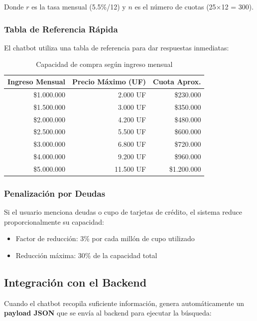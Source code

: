 \documentclass[11pt,letterpaper]{article}
\begin{document}
Donde $r$ es la tasa mensual (5.5\%/12) y $n$ es el número de cuotas (25$\times$12 = 300).

\subsubsection{Tabla de Referencia Rápida}

El chatbot utiliza una tabla de referencia para dar respuestas inmediatas:

\begin{table}[H]
\centering
\caption{Capacidad de compra según ingreso mensual}
\label{tab:capacidad}
\begin{tabular}{@{}rrr@{}}
\toprule
\textbf{Ingreso Mensual} & \textbf{Precio Máximo (UF)} & \textbf{Cuota Aprox.} \\
\midrule
\$1.000.000 & 2.000 UF & \$230.000 \\
\$1.500.000 & 3.000 UF & \$350.000 \\
\$2.000.000 & 4.200 UF & \$480.000 \\
\$2.500.000 & 5.500 UF & \$600.000 \\
\$3.000.000 & 6.800 UF & \$720.000 \\
\$4.000.000 & 9.200 UF & \$960.000 \\
\$5.000.000 & 11.500 UF & \$1.200.000 \\
\bottomrule
\end{tabular}
\end{table}

\subsubsection{Penalización por Deudas}

Si el usuario menciona deudas o cupo de tarjetas de crédito, el sistema reduce proporcionalmente su capacidad:

\begin{itemize}
    \item Factor de reducción: 3\% por cada millón de cupo utilizado
    \item Reducción máxima: 30\% de la capacidad total
\end{itemize}

\subsection{Integración con el Backend}

Cuando el chatbot recopila suficiente información, genera automáticamente un \textbf{payload JSON} que se envía al backend para ejecutar la búsqueda:
\end{document}
